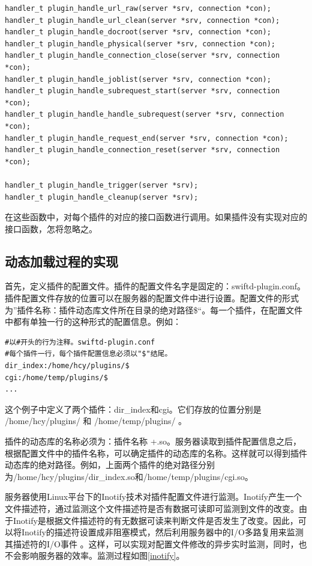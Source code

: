 \documentclass[12pt, twoside, a4paper, xetex]{report}
\begin{document}
\begin{verbatim}
handler_t plugin_handle_url_raw(server *srv, connection *con);
handler_t plugin_handle_url_clean(server *srv, connection *con);
handler_t plugin_handle_docroot(server *srv, connection *con);
handler_t plugin_handle_physical(server *srv, connection *con);
handler_t plugin_handle_connection_close(server *srv, connection *con);
handler_t plugin_handle_joblist(server *srv, connection *con);
handler_t plugin_handle_subrequest_start(server *srv, connection *con);
handler_t plugin_handle_handle_subrequest(server *srv, connection *con);
handler_t plugin_handle_request_end(server *srv, connection *con);
handler_t plugin_handle_connection_reset(server *srv, connection *con);

handler_t plugin_handle_trigger(server *srv);
handler_t plugin_handle_cleanup(server *srv);
\end{verbatim}
	在这些函数中，对每个插件的对应的接口函数进行调用。如果插件没有实现对应的接口函数，怎将忽略之。
	
\subsection{动态加载过程的实现}
	首先，定义插件的配置文件。插件的配置文件名字是固定的：swiftd-plugin.conf。插件配置文件存放的位置可以在服务器的配置文件中进行设置。配置文件的形式为”插件名称：插件动态库文件所在目录的绝对路径\$“。每一个插件，在配置文件中都有单独一行的这种形式的配置信息。例如：
	
	\begin{verbatim}
#以#开头的行为注释。swiftd-plugin.conf
#每个插件一行，每个插件配置信息必须以"$"结尾。
dir_index:/home/hcy/plugins/$
cgi:/home/temp/plugins/$
...
	\end{verbatim}

	这个例子中定义了两个插件：dir\_index和cgi。它们存放的位置分别是 /home/hcy/plugins/ 和 /home/temp/plugins/ 。
	
	插件的动态库的名称必须为：插件名称 +.so。服务器读取到插件配置信息之后，根据配置文件中的插件名称，可以确定插件的动态库的名称。这样就可以得到插件动态库的绝对路径。例如，上面两个插件的绝对路径分别为/home/hcy/plugins/dir\_index.so和/home/temp/plugins/cgi.so。
	
	服务器使用Linux平台下的Inotify技术对插件配置文件进行监测。Inotify产生一个文件描述符，通过监测这个文件描述符是否有数据可读即可监测到文件的改变。由于Inotify是根据文件描述符的有无数据可读来判断文件是否发生了改变。因此，可以将Inotify的描述符设置成非阻塞模式，然后利用服务器中的I/O多路复用来监测其描述符的I/O事件 。这样，可以实现对配置文件修改的异步实时监测，同时，也不会影响服务器的效率。监测过程如图\ref{inotify}。
	
\end{document}
